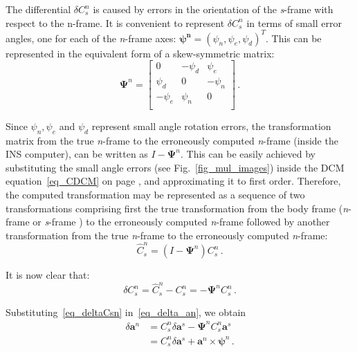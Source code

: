 \documentclass[journal]{IEEEtran}
\begin{document}
The differential $\delta C_{s}^{n}$ is caused by errors in the orientation of the \textit{s}-frame with respect to the {n}-frame. It is convenient to represent $\delta C_{s}^{n}$ in terms of small error angles, one for each of the \textit{n}-frame axes: $\boldsymbol{\psi^n}=(\psi_n, \psi_e, \psi_d)^T$. This can be represented in the equivalent form of a skew-symmetric matrix:
\begin{equation}
    \boldsymbol{\Psi}^n=\left[\begin{array}{rrr}
         {0}&-{\psi_d}&{\psi_e}\\
         {\psi_d}&{0}&-{\psi_n}\\ 
         -{\psi_e}&{\psi_n}&{0}\\
          \end{array} \right]\,.
    \label{eq_tiltskew}
\end{equation}

Since $\psi_n, \psi_e$ and $\psi_d$ represent small  angle rotation errors, the transformation matrix from the true \textit{n}-frame to the erroneously computed \textit{n}-frame (inside the INS computer),  can be written as $I-\boldsymbol{\Psi}^n$. This can be easily achieved by substituting the small angle errors (see Fig.~\ref{fig_mul_images})
inside the DCM  equation~\eqref{eq_CDCM} on page \pageref{eq_CDCM}, and approximating it to first order. Therefore,
the computed transformation may be represented as a sequence of two transformations comprising first the true transformation  from  the  body frame (\textit{n}-frame or \textit{s}-frame )  to  the erroneously computed \textit{n}-frame followed by another  transformation  from the true \textit{n}-frame to the erroneously computed \textit{n}-frame:
\begin{equation}
     \hat{C}_{s}^{n}=(I-\boldsymbol{\Psi}^n) C_{s}^{n} \,.
\end{equation}

It is now clear that:
\begin{equation}\label{eq_deltaCsn}
  \delta{C}_{s}^{n}  =\hat{C}_{s}^{n}-C_{s}^{n} =-\boldsymbol{\Psi}^n C_{s}^{n} \,.
\end{equation}

Substituting~\eqref{eq_deltaCsn} in~\eqref{eq_delta_an}, we obtain
\begin{equation}\label{eq_delta_anmod}
\begin{split}
    \delta \boldsymbol{a}^n&= C_{s}^{n} \delta \boldsymbol{a}^s -\boldsymbol{\Psi}^n C_{s}^{n}{\boldsymbol{a}}^{s}\\
      &=C_{s}^{n} \delta \boldsymbol{a}^s +\boldsymbol{a}^{n}\times\boldsymbol{\psi}^n\,.
    \end{split}
\end{equation}
\end{document}
